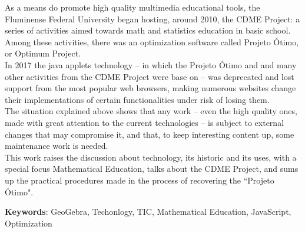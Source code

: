 \documentclass[12pt,openright,twoside,a4paper,brazil]{abntex2}
\begin{document}
\begin{resumo}[Abstract]

    As a means do promote high quality multimedia educational tools, the Fluminense Federal University began hosting, around 2010, the CDME Project: a series of activities aimed towards math and statistics education in basic school. Among these activities, there was an optimization software called Projeto Ótimo, or Optimum Project.
    \\
    
    In 2017 the java applets technology -- in which the Projeto Ótimo and and many other activities from the CDME Project were base on --  was deprecated and lost support from the most popular web browsers, making numerous websites change their implementations of certain functionalities under risk of losing them.
    \\
    
    The situation explained above shows that any work -- even the high quality ones, made with great attention to the current technologies -- is subject to external changes that may compromise it, and that, to keep interesting content up, some maintenance work is needed.
    \\
    
    This work raises the discussion about technology, its historic and its uses, with a special focus Mathematical Education, talks about the CDME Project, and sums up the practical procedures made in the process of recovering the ``Projeto Ótimo".
    
    
    \vspace{\onelineskip}
    \noindent
    \textbf{Keywords}: GeoGebra, Techonlogy, TIC, Mathematical Education, JavaScript, Optimization
\end{resumo}

\tableofcontents*
\cleardoublepage

\textual

\OnehalfSpacing

\setcounter{page}{1}



\end{document}
